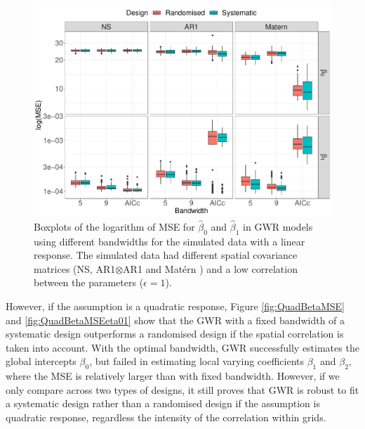 \documentclass[a4paper]{article} 	%
\newcommand{\Matern}{Mat\'ern }
\begin{document}
\begin{figure}[H]
	\centering
	\includegraphics[width=\linewidth]{Expt/Col_LinCombMSE_newpar.pdf}
	\caption{Boxplots of the logarithm of MSE for $\hat{\beta}_0$ and $\hat{\beta}_1$ in GWR models using different bandwidths for the simulated data with a linear response. The simulated data had different spatial covariance matrices (NS, AR1$\otimes$AR1 and \Matern) and a low correlation between the parameters ($\epsilon=1$).}\label{fig:LinBetaMSE}
\end{figure}



However, if the assumption is a quadratic response, Figure \ref{fig:QuadBetaMSE} and \ref{fig:QuadBetaMSEeta01} show that the GWR with a fixed bandwidth of a systematic design outperforms a randomised design if the spatial correlation is taken into account. With the optimal bandwidth, GWR successfully estimates the global intercepts $\beta_0$, but failed in estimating local varying coefficients $\beta_1$ and $\beta_2$, where the MSE is relatively larger than with fixed bandwidth. However, if we only compare across two types of designs, it still proves that GWR is robust to fit a systematic design rather than a randomised design if the assumption is quadratic response, regardless the intensity of the correlation within grids. 
\end{document}
